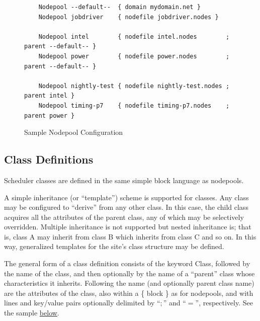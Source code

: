     \begin{figure}[H]
    
\begin{verbatim}
    Nodepool --default--  { domain mydomain.net }
    Nodepool jobdriver    { nodefile jobdriver.nodes }
    
    Nodepool intel        { nodefile intel.nodes        ; parent --default-- }
    Nodepool power        { nodefile power.nodes        ; parent --default-- }

    Nodepool nightly-test { nodefile nightly-test.nodes ; parent intel }
    Nodepool timing-p7    { nodefile timing-p7.nodes    ; parent power }
\end{verbatim}
      \caption{Sample Nodepool Configuration}
      \label{fig:nodepool.configuration}

    \end{figure}    


    \subsection{Class Definitions}
    \label{subsubsec:class.configuration}

    Scheduler classes are defined in the same simple block language as
    nodepools.

    A simple inheritance (or ``template'') scheme is supported for classes.  Any
    class may be configured to ``derive'' from any other class.  In this case, the
    child class acquires all the attributes of the parent class, any of which may
    be selectively overridden.  Multiple inheritance is not supported but
    nested inheritance is; that is, class A may inherit from class B which inherits
    from class C and so on. In this way, generalized templates for the site's
    class structure may be defined.  

    The general form of a class definition consists of the keyword Class, followed
    by the name of the class, and then optionally by the name of a ``parent'' class
    whose characteristics it inherits.   Following the name (and optionally parent class
    name) are the attributes of the class, also within a \{ block \} as for nodepools, and
    with lines and key/value pairs optionally delimited by  ``$;$'' and ``$=$'', respectively.
    See the sample \hyperref[fig:class.configuration]{below}.

